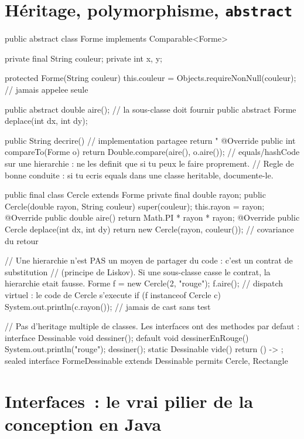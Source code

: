 \documentclass[12pt,a4paper,twoside,openright]{book}
\begin{document}
\section{H\'eritage, polymorphisme, \texttt{abstract}}

\begin{codejava}
public abstract class Forme implements Comparable<Forme> {
    private final String couleur;
    private int x, y;

    protected Forme(String couleur) { this.couleur = Objects.requireNonNull(couleur); }   // jamais appelee seule

    public abstract double aire();                       // la sous-classe doit fournir
    public abstract Forme deplace(int dx, int dy);

    public String decrire() {                          // implementation partagee
        return "%
    }
    @Override public int compareTo(Forme o) { return Double.compare(aire(), o.aire()); }
    // equals/hashCode sur une hierarchie : ne les definit que si tu peux le faire proprement.
    // Regle de bonne conduite : si tu ecris equals dans une classe heritable, documente-le.
}

public final class Cercle extends Forme {
    private final double rayon;
    public Cercle(double rayon, String couleur) { super(couleur); this.rayon = rayon; }
    @Override public double aire() { return Math.PI * rayon * rayon; }
    @Override public Cercle deplace(int dx, int dy) { return new Cercle(rayon, couleur()); }  // covariance du retour
}

// Une hierarchie n'est PAS un moyen de partager du code : c'est un contrat de substitution
// (principe de Liskov). Si une sous-classe casse le contrat, la hierarchie etait fausse.
Forme f = new Cercle(2, "rouge");
f.aire();                       // dispatch virtuel : le code de Cercle s'execute
if (f instanceof Cercle c) { System.out.println(c.rayon()); }   // jamais de cast sans test

// Pas d'heritage multiple de classes. Les interfaces ont des methodes par defaut :
interface Dessinable {
    void dessiner();
    default void dessinerEnRouge() { System.out.println("rouge"); dessiner(); }
    static Dessinable vide() { return () -> { }; }
    sealed interface FormeDessinable extends Dessinable permits Cercle, Rectangle { }
}
\end{codejava}

\section{Interfaces~: le vrai pilier de la conception en Java}
\end{document}
